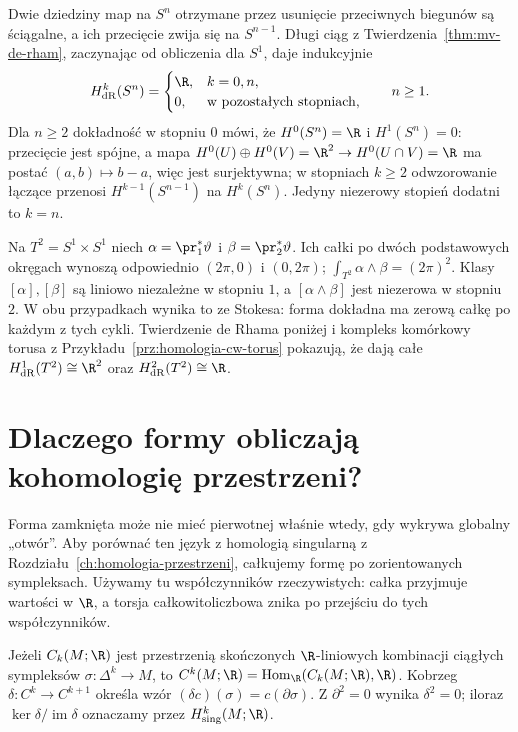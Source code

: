 \begin{przyklad}
\label{prz:de-rham-sfery-torus}
Dwie dziedziny map na $S^n$ otrzymane przez usunięcie
przeciwnych biegunów są ściągalne, a ich przecięcie
zwija się na $S^{n-1}$. Długi ciąg z
Twierdzenia~\ref{thm:mv-de-rham}, zaczynając od
obliczenia dla $S^1$, daje indukcyjnie
\[
 H^k_{\mathrm{dR}}(S^n)=
 \begin{cases}\R,&k=0,n,\\0,&\text{w pozostałych stopniach,}\end{cases}
 \qquad n\geq1.
\]
Dla $n\geq2$ dokładność w stopniu $0$ mówi,
że $H^0(S^n)=\R$ i $H^1(S^n)=0$:
przecięcie jest spójne, a mapa
$H^0(U)\oplus H^0(V)=\R^2\to H^0(U\cap V)=\R$
ma postać $(a,b)\mapsto b-a$, więc jest surjektywna;
w stopniach $k\geq2$ odwzorowanie łączące
przenosi $H^{k-1}(S^{n-1})$ na $H^k(S^n)$.
Jedyny niezerowy stopień dodatni to $k=n$.

Na $T^2=S^1\times S^1$ niech
$\alpha=\pr_1^*\vartheta$ i
$\beta=\pr_2^*\vartheta$.
Ich całki po dwóch podstawowych okręgach
wynoszą odpowiednio $(2\pi,0)$ i $(0,2\pi)$;
$\int_{T^2}\alpha\wedge\beta=(2\pi)^2$.
Klasy $[\alpha],[\beta]$ są liniowo niezależne w stopniu $1$,
a $[\alpha\wedge\beta]$ jest niezerowa w stopniu $2$.
W obu przypadkach wynika to ze Stokesa: forma dokładna
ma zerową całkę po każdym z tych cykli.
Twierdzenie de Rhama poniżej i kompleks komórkowy
torusa z Przykładu~\ref{prz:homologia-cw-torus}
pokazują, że dają całe
$H^1_{\mathrm{dR}}(T^2)\cong\R^2$ oraz
$H^2_{\mathrm{dR}}(T^2)\cong\R$.
\end{przyklad}

\section{Dlaczego formy obliczają kohomologię przestrzeni?}
\label{sec:twierdzenie-de-rhama}

Forma zamknięta może nie mieć pierwotnej właśnie wtedy,
gdy wykrywa globalny „otwór”. Aby porównać ten język
z homologią singularną z Rozdziału~\ref{ch:homologia-przestrzeni},
całkujemy formę po zorientowanych sympleksach.
Używamy tu współczynników rzeczywistych: całka przyjmuje
wartości w $\R$, a torsja całkowitoliczbowa znika po
przejściu do tych współczynników.

\begin{definicja}
\label{def:singular-cohom-r}
Jeżeli $C_k(M;\R)$ jest przestrzenią skończonych
$\R$-liniowych kombinacji ciągłych sympleksów
$\sigma:\Delta^k\to M$, to
$C^k(M;\R)=\operatorname{Hom}_{\R}(C_k(M;\R),\R)$.
Kobrzeg $\delta:C^k\to C^{k+1}$ określa wzór
$(\delta c)(\sigma)=c(\partial\sigma)$.
Z $\partial^2=0$ wynika $\delta^2=0$; iloraz
$\ker\delta/\operatorname{im}\delta$ oznaczamy przez
$H^k_{\mathrm{sing}}(M;\R)$.
\end{definicja}

